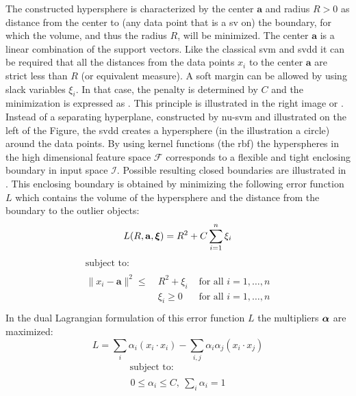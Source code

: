 The constructed hypersphere is characterized by the center $\mathbf{a}$ and radius $R > 0$ as distance from the center to (any data point that is a \gls{sv} on) the boundary, for which the volume, and thus the radius $R$, will be minimized.
The center $\mathbf{a}$ is a linear combination of the support vectors.
Like the classical \gls{svm} and \gls{svdd} it can be required that all the distances from the data points $x_i$ to the center $\mathbf{a}$ are strict less than $R$ (or equivalent measure).
A soft margin can be allowed by using slack variables $\xi_i$.
In that case, the penalty is determined by $C$ and the minimization is expressed as .
This principle is illustrated in the right image or .
Instead of a separating hyperplane, constructed by \gls{nu-svm} and illustrated on the left of the Figure, the \gls{svdd} creates a hypersphere (in the illustration a circle) around the data points.
By using kernel functions (\eg the \gls{rbf}) the hyperspheres in the high dimensional feature space $\mathcal{F}$ corresponds to a flexible and tight enclosing boundary in input space $\mathcal{I}$.
Possible resulting closed boundaries are illustrated in .
This enclosing boundary is obtained by minimizing the following error function $L$ which contains the volume of the hypersphere and the distance from the boundary to the outlier objects:
\begin{equation}\label{eq:svdd_objective}
  L(R, \mathbf{a}, \vectorsym{\xi}) = R^2 + C \sum_{i=1}^n \xi_i
\end{equation}
\begin{equation}
  \begin{multlined}
    \mbox{ subject to: } \\
    \begin{aligned}
      \lVert x_i - \mathbf{a} \rVert ^ 2 \leq \: & R^2 + \xi_i & \mbox{ for all } i = 1, \dots, n \\
      & \xi_i \geq 0 & \mbox{ for all } i = 1, \dots, n \\
    \end{aligned}
  \end{multlined}
\end{equation}
In the dual Lagrangian formulation of this error function $L$ the multipliers $\vectorsym{\alpha}$ are maximized:
\begin{equation}\label{eq:svdd_lagrange}
  L = \sum_{i} \alpha_i(x_i \cdot x_i) - \sum_{i,j} \alpha_i \alpha_j(x_i \cdot x_j)
\end{equation}
\begin{equation}
  \begin{multlined}
    \mbox{ subject to: } \\
    \begin{aligned}
    0 \le \alpha_i \le C, \: \sum_{i} \alpha_i = 1
    \end{aligned}
  \end{multlined}
\end{equation}

